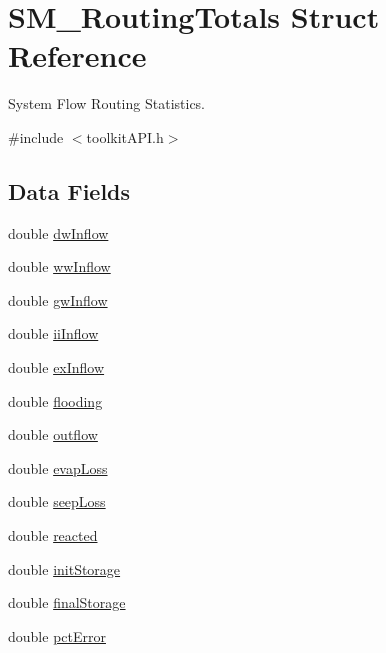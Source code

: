 \hypertarget{struct_s_m___routing_totals}{}\section{S\+M\+\_\+\+Routing\+Totals Struct Reference}
\label{struct_s_m___routing_totals}


System Flow Routing Statistics.  




{\ttfamily \#include $<$toolkit\+A\+P\+I.\+h$>$}

\subsection*{Data Fields}
\begin{DoxyCompactItemize}
\item 
double \mbox{\hyperlink{struct_s_m___routing_totals_a2ba50058866e2c864a95e5d8f91ec880}{dw\+Inflow}}
\item 
double \mbox{\hyperlink{struct_s_m___routing_totals_addf6c3df2db37a38a6f6d64a585f9b50}{ww\+Inflow}}
\item 
double \mbox{\hyperlink{struct_s_m___routing_totals_a2c11b6011754787a9180be20704af814}{gw\+Inflow}}
\item 
double \mbox{\hyperlink{struct_s_m___routing_totals_a8a0c006b8764f6a17349262044f997ca}{ii\+Inflow}}
\item 
double \mbox{\hyperlink{struct_s_m___routing_totals_a16d57de84cbbf43c3bd19fd011792c1b}{ex\+Inflow}}
\item 
double \mbox{\hyperlink{struct_s_m___routing_totals_af224d4ef44bc7427a3aadfcb36008782}{flooding}}
\item 
double \mbox{\hyperlink{struct_s_m___routing_totals_acdc4839742c90f3ca60e8243b8631b1b}{outflow}}
\item 
double \mbox{\hyperlink{struct_s_m___routing_totals_a041b11f3c42dc3f9ffe2d3112e3ecc0e}{evap\+Loss}}
\item 
double \mbox{\hyperlink{struct_s_m___routing_totals_af23b8cac0bd9aa9dab61553ddc423443}{seep\+Loss}}
\item 
double \mbox{\hyperlink{struct_s_m___routing_totals_a97407af14eadcba842d2dfc60c256612}{reacted}}
\item 
double \mbox{\hyperlink{struct_s_m___routing_totals_add0f27c9cc788302f259ee9a4c9b2f48}{init\+Storage}}
\item 
double \mbox{\hyperlink{struct_s_m___routing_totals_ae2e8a073faa2b013982ffc0fedf9e376}{final\+Storage}}
\item 
double \mbox{\hyperlink{struct_s_m___routing_totals_a061bfec118db4216f0062258ce029ec2}{pct\+Error}}
\end{DoxyCompactItemize}


